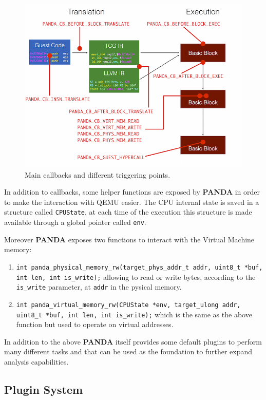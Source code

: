 \begin{figure}[ht]
\centering
\includegraphics[width=\linewidth]{images/callback_diagram.png}
\caption{Main callbacks and different triggering points. }
\label{fig:calls}
\end{figure}

In addition to callbacks, some helper functions are exposed by \textbf{PANDA} in order to make the interaction with QEMU easier. The CPU internal state is saved in a structure called \lstinline{CPUState}, at each time of the execution this structure is made available through a global pointer called \lstinline{env}. 

Moreover \textbf{PANDA} exposes two functions to interact with the Virtual Machine memory: 
\begin{enumerate}
    \item \lstinline{int panda_physical_memory_rw(target_phys_addr_t addr, uint8_t *buf, int len, int is_write);} allowing to read or write bytes, according to the \lstinline{is_write} parameter, at \lstinline{addr} in the pysical memory.
    \item \lstinline{int panda_virtual_memory_rw(CPUState *env, target_ulong addr, uint8_t *buf, int len, int is_write);} which is the same as the above function but used to operate on virtual addresses.
\end{enumerate}


In addition to the above \textbf{PANDA} itself provides some default plugins to perform many different tasks and that can be used as the foundation to further expand analysis capabilities.


\subsection{Plugin System}

